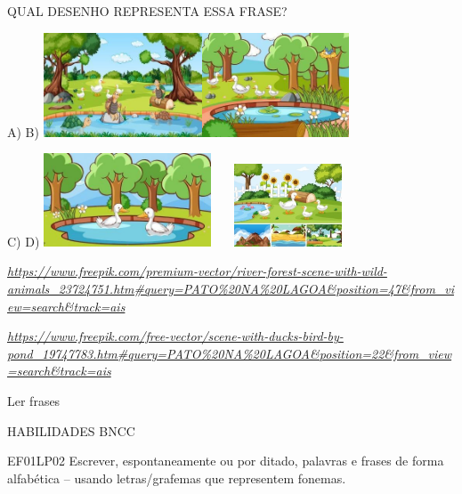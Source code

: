 QUAL DESENHO REPRESENTA ESSA FRASE?

A) B)
\includegraphics[width=1.85903in,height=1.21806in]{media/image250.jpg}\includegraphics[width=1.71806in,height=1.21875in]{media/image251.jpg}

C) D)
\includegraphics[width=1.96319in,height=1.09028in]{media/image252.jpg}\includegraphics[width=1.78681in,height=0.96806in]{media/image253.jpg}

\href{https://www.freepik.com/premium-vector/river-forest-scene-with-wild-animals_23724751.htm\#query=PATO\%20NA\%20LAGOA\&position=47\&from_view=search\&track=ais}{\emph{https://www.freepik.com/premium-vector/river-forest-scene-with-wild-animals\_23724751.htm\#query=PATO\%20NA\%20LAGOA\&position=47\&from\_view=search\&track=ais}}

\href{https://www.freepik.com/free-vector/scene-with-ducks-bird-by-pond_19747783.htm\#query=PATO\%20NA\%20LAGOA\&position=22\&from_view=search\&track=ais}{\emph{https://www.freepik.com/free-vector/scene-with-ducks-bird-by-pond\_19747783.htm\#query=PATO\%20NA\%20LAGOA\&position=22\&from\_view=search\&track=ais}}

Ler frases

HABILIDADES BNCC

EF01LP02 Escrever, espontaneamente ou por ditado, palavras e frases de
forma alfabética -- usando letras/grafemas que representem fonemas.

